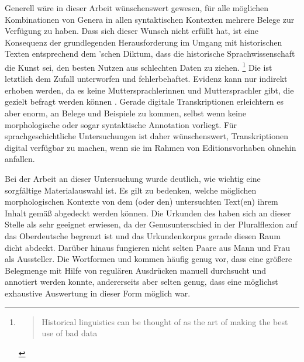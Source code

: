 Generell wäre in dieser Arbeit wünschenswert gewesen, für alle möglichen
Kombinationen von Genera in allen syntaktischen Kontexten mehrere
Belege zur Verfügung zu haben. Dass sich dieser Wunsch nicht erfüllt hat, ist
eine Konsequenz der grundlegenden Herausforderung im Umgang mit historischen
Texten entsprechend dem \citeauthor{labov1994}'schen Diktum, dass die
historische Sprachwissenschaft die Kunst sei, den besten Nutzen aus schlechten
Daten zu ziehen.%
%
	\footnote{\foreignblockcquote{english}[11]{labov1994}{Historical
		linguistics can \textelp{} be thought of as the art of making the best
		use of bad data}.%
	}
%
Die  ist letztlich dem Zufall unterworfen und
fehlerbehaftet. Evidenz kann nur indirekt erhoben werden, da es keine
Muttersprachlerinnen und Muttersprachler gibt, die gezielt befragt werden
können \autocite[11]{labov1994}. Gerade digitale
Transkriptionen erleichtern es aber enorm, an Belege und
Beispiele zu kommen, selbst wenn keine morphologische oder sogar syntaktische
Annotation vorliegt.
Für sprachgeschichtliche Untersuchungen ist daher
wünschenswert, Transkriptionen digital verfügbar zu machen,
wenn sie im Rahmen von Editionsvorhaben ohnehin
anfallen.

Bei der Arbeit an dieser Untersuchung wurde deutlich, wie wichtig eine
sorgfältige Material\-auswahl ist. Es gilt zu bedenken, welche möglichen
morphologischen Kontexte von dem (oder den) untersuchten Text(en) ihrem Inhalt
gemäß abgedeckt werden können. Die Urkunden des \CAO{} haben sich
an dieser Stelle als sehr geeignet erwiesen, da der Genusunterschied in der
Pluralflexion auf das Oberdeutsche begrenzt ist und das
Urkundenkorpus gerade diesen Raum dicht abdeckt. Darüber
hinaus fungieren nicht selten Paare aus Mann und Frau als Aussteller. Die
Wortformen  und  kommen häufig genug vor, dass eine
größere Belegmenge mit Hilfe von regulären Ausdrücken
manuell durchsucht und annotiert werden konnte, andererseits aber selten genug,
dass eine möglichst exhaustive Auswertung in dieser Form möglich war.

